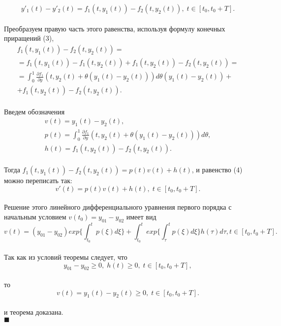 \begin{equation*}\tag{4}
y'_1(t)-y'_2(t)=f_1(t,y_1(t))-f_2(t,y_2(t)), \;t\in[t_0,t_0+T].
\end{equation*}\\
Преобразуем правую часть этого равенства, используя формулу конечных приращений (3),
\begin{equation*}
\begin{split}
f_1(t,y_1(t))-f_2(t,y_2(t))= \\
=f_1(t,y_1(t))-f_1(t,y_2(t))+f_1(t,y_2(t))-f_2(t,y_2(t))=\\
=\int_0^1 \frac{\partial f_1}{\partial y}(t,y_2(t)+\theta(y_1(t)-y_2(t)))d\theta(y_1(t)-y_2(t))+\\
+f_1(t,y_2(t))-f_2(t,y_2(t)).
\end{split}
\end{equation*}\\
Введем обозначения
\begin{equation*}
\begin{split}
v(t)=y_1(t)-y_2(t),\\
p(t)= \int_0^1 \frac{\partial f_1}{\partial y}(t,y_2(t)+\theta(y_1(t)-y_2(t)))d\theta,\\
h(t)=f_1(t,y_2(t))-f_2(t,y_2(t)).
\end{split}
\end{equation*}\\
Тогда $f_1(t,y_1(t))-f_2(t,y_2(t))=p(t)v(t)+h(t)$, и равенство (4) можно переписать так:
\begin{equation*}
v'(t)=p(t)v(t)+h(t),\; t\in[t_0,t_0+T].
\end{equation*}\\
Решение этого линейного дифференциального уравнения первого порядка с начальным условием $v(t_0)=y_{01}-y_{02}$ имеет вид
\begin{equation*}
v(t)=(y_{01}-y_{02})exp\big\{ \int_{t_0}^t p(\xi)d\xi \big\}+ \int_{t_0}^t exp\big\{\int_{\tau}^t p(\xi)d\xi \big\}h(\tau)d\tau , t\in[t_0,t_0+T].
\end{equation*}\\
Так как из условий теоремы следует, что 
\begin{equation*}
y_{01}-y_{02}\geq 0,\; h(t)\geq 0,\; t\in[t_0,t_0+T],
\end{equation*}\\
то
\begin{equation*}
v(t)=y_1(t)-y_2(t)\geq 0,\; t\in[t_0,t_0+T].
\end{equation*}\\
и теорема доказана.\\
$\blacksquare$\\


